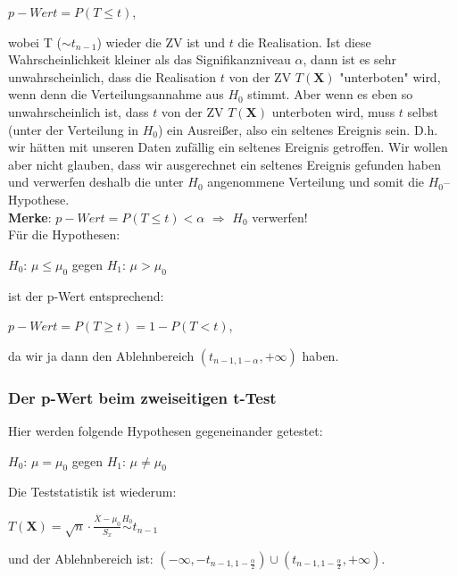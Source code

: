 \documentclass[a4paper]{article}
\newcommand{\simtext}[1]{\ensuremath{\stackrel{\text{#1}}{\sim}}}
\newcommand\dangersign[1][2ex]{%
  \renewcommand\stacktype{L}%
  \scaleto{\stackon[1.3pt]{\color{red}$\triangle$}{\tiny !}}{#1}%
}
\begin{document}
\begin{center} $p-Wert=P(T \leq t)$, \end{center} 
wobei T ($\sim t_{n-1}$) wieder die ZV ist und $t$ die Realisation. Ist diese Wahrscheinlichkeit kleiner als das Signifikanzniveau $\alpha$, dann ist es sehr unwahrscheinlich, dass die Realisation $t$ von der ZV $T(\textbf{X})$ "unterboten" wird, wenn denn die Verteilungsannahme aus $H_0$ stimmt. Aber wenn es eben so unwahrscheinlich ist, dass $t$ von der ZV $T(\textbf{X})$ unterboten wird, muss $t$ selbst (unter der Verteilung in $H_0$) ein Ausreißer, also ein seltenes Ereignis sein. D.h. wir hätten mit unseren Daten zufällig ein seltenes Ereignis getroffen. Wir wollen aber nicht glauben, dass wir ausgerechnet ein seltenes Ereignis gefunden haben und verwerfen deshalb die unter $H_0$ angenommene Verteilung und somit die $H_0$--Hypothese. \\

\textbf{Merke}: $p-Wert=P(T \leq t) < \alpha$ $\Rightarrow$ $H_0$ verwerfen! \\[1.5cm]

\noindent \dangersign[3ex] Für die Hypothesen: \\
\begin{center} $H_0$: $\mu \leq \mu_0$ \hspace{2cm }gegen \hspace{2cm } $H_1$: $\mu > \mu_0$ \end{center}
ist der p-Wert entsprechend:
\begin{center} $p-Wert=P(T \geq t)=1-P(T < t)$, \end{center} 
da wir ja dann den Ablehnbereich $(t_{n-1,1-\alpha}, + \infty)$ haben.

\subsubsection{Der p-Wert beim zweiseitigen t-Test}\label{sec:pWert2}

Hier werden folgende Hypothesen gegeneinander getestet:
\begin{center} $H_0$: $\mu = \mu_0$ \hspace{2cm }gegen \hspace{2cm } $H_1$: $\mu \neq \mu_0$ \end{center}
Die Teststatistik ist wiederum:
\begin{center} $T(\textbf{X})=\sqrt{n}\cdot\frac{\overline{X}-\mu_0}{S_x} \simtext{$H_0$} t_{n-1}$ \end{center}
und der Ablehnbereich ist: $(-\infty, -t_{n-1,1-\frac{\alpha}{2}}) \cup (t_{n-1,1-\frac{\alpha}{2}}, +\infty)$.
\end{document}
